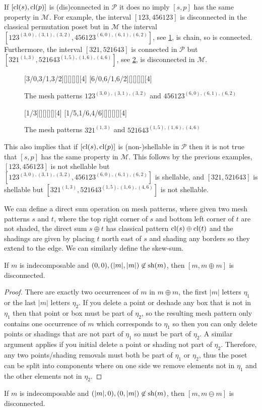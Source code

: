 \documentclass[11pt,a4paper,oneside]{article}
\begin{document}
If $[\operatorname{\textrm{cl}}(s),\operatorname{\textrm{cl}}(p)]$ is (dis)connected in $\mathcal{P}$ it does no imply $[s,p]$ has the same property in $\mathcal{M}$. For example, the interval $[123,456123]$ is disconnected in the classical permutation poset but in $\mathcal{M}$ the interval $[123^{(3,0),(3,1),(3,2)},456123^{(6,0),(6,1),(6,2)}]$, see \cref{fig:123}, is chain, so is connected. Furthermore, the interval $[321,521643]$ is connected in $\mathcal{P}$ but $[321^{(1, 3)},521643^{(1, 5), (1, 6), (4, 6)}]$, see \cref{fig:321}, is disconnected in $\mathcal{M}$.
\begin{figure}\centering
{}[3/0,3/1,3/2][][][][][4]
[6/0,6/1,6/2][][][][][4]
\caption{The mesh patterns $123^{(3,0),(3,1),(3,2)}$ and $456123^{(6,0),(6,1),(6,2)}$}\label{fig:123}
\end{figure}
\begin{figure}\centering
{}[1/3][][][][][4]
[1/5,1/6,4/6][][][][][4]
\caption{The mesh patterns $321^{(1, 3)}$ and $521643^{(1, 5), (1, 6), (4, 6)}$}\label{fig:321}
\end{figure}

This also implies that if $[\operatorname{\textrm{cl}}(s),\operatorname{\textrm{cl}}(p)]$ is (non-)shellable in $\mathcal{P}$ then it is not true that $[s,p]$ has the same property in $\mathcal{M}$. This follows by the previous examples, $[123,456123]$ is not shellable but $[123^{(3,0),(3,1),(3,2)},456123^{(6,0),(6,1),(6,2)}]$ is shellable, and $[321,521643]$ is shellable but $[321^{(1, 3)},521643^{(1, 5), (1, 6), (4, 6)}]$ is not shellable.

We can define a direct sum operation on mesh patterns, where given two mesh patterns $s$ and $t$, where the top right corner of $s$ and bottom left corner of $t$ are not shaded, the direct sum $s\oplus t$ has classical pattern $\operatorname{\textrm{cl}}(s)\oplus\operatorname{\textrm{cl}}(t)$ and the shadings are given by placing $t$ north east of $s$ and shading any borders so they extend to the edge. We can similarly define the skew-sum.

\begin{lem}
If $m$ is indecomposable and $(0,0),(|m|,|m|)\not\in\operatorname{\textrm{sh}}(m)$, then $[m,m\oplus m]$ is disconnected.
\begin{proof}
There are exactly two occurrences of $m$ in $m\oplus m$, the first $|m|$ letters $\eta_1$ or the last $|m|$ letters $\eta_2$. If you delete a point or deshade any box that is not in $\eta_1$ then that point or box must be part of $\eta_2$, so the resulting mesh pattern only contains one occurrence of $m$ which corresponds to $\eta_1$ so then you can only delete points or shadings that are not part of $\eta_1$ so must be part of $\eta_2$. A similar argument applies if you initial delete a point or shading not part of $\eta_2$. Therefore, any two points/shading removals must both be part of $\eta_1$ or $\eta_2$, thus the poset can be split into components where on one side we remove elements not in $\eta_1$ and the other elements not in $\eta_2$.
\end{proof}
\end{lem}
\begin{cor}
If $m$ is indecomposable and $(|m|,0),(0,|m|)\not\in\operatorname{\textrm{sh}}(m)$, then $[m,m\ominus m]$ is disconnected.
\end{cor}
\end{document}
